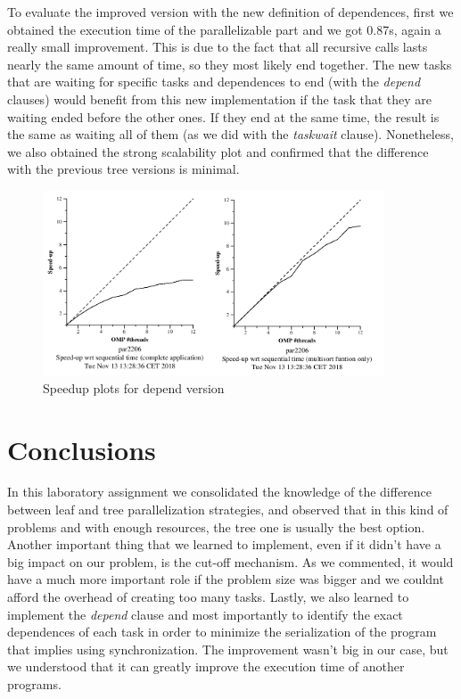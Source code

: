 \documentclass{article}
\begin{document}
\justify
To evaluate the improved version with the new definition of dependences, first we obtained the execution time of the parallelizable part and we got 0.87s, again a really small improvement. This is due to the fact that all recursive calls lasts nearly the same amount of time, so they most likely end together. The new tasks that are waiting for specific tasks and dependences to end (with the \textit{depend} clauses) would benefit from this new implementation if the task that they are waiting ended before the other ones. If they end at the same time, the result is the same as waiting all of them (as we did with the \textit{taskwait} clause).
\justify
Nonetheless, we also obtained the strong scalability plot and confirmed that the difference with the previous tree versions is minimal.

\begin{figure}[!h]
    \centering
    \includegraphics[width=0.9\textwidth]{treeCDepend.png}
    \caption{Speedup plots for depend version }
    \label{fig:tareador}
\end{figure}

\clearpage
\section{Conclusions}
\justify

In this laboratory assignment we consolidated the knowledge of the difference between leaf and tree parallelization strategies, and observed that in this kind of problems and with enough resources, the tree one is usually the best option. 
\justify
Another important thing that we learned to implement, even if it didn't have a big impact on our problem, is the cut-off mechanism. As we commented, it would have a much more important role if the problem size was bigger and we couldnt afford the overhead of creating too many tasks.
\justify
Lastly, we also learned to implement the \textit{depend} clause and most importantly to identify the exact dependences of each task in order to minimize the serialization of the program that implies using synchronization. The improvement wasn't big in our case, but we understood that it can greatly improve the execution time of another programs.
\end{document}
